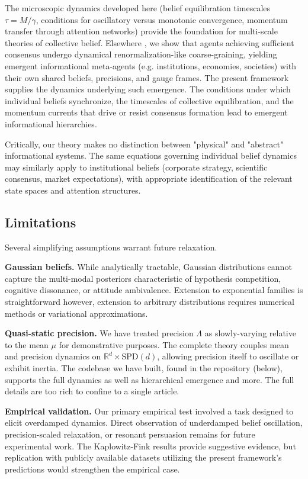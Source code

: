 \documentclass[12pt]{article}
\begin{document}
The microscopic dynamics developed here (belief equilibration timescales $\tau = M/\gamma$, conditions for oscillatory versus monotonic convergence, momentum transfer through attention networks) provide the foundation for multi-scale theories of collective belief. Elsewhere \citet{Dennis2025b}, we show that agents achieving sufficient consensus undergo dynamical renormalization-like coarse-graining, yielding emergent informational meta-agents (e.g. institutions, economies, societies) with their own shared beliefs, precisions, and gauge frames. The present framework supplies the dynamics underlying such emergence.  The conditions under which individual beliefs synchronize, the timescales of collective equilibration, and the momentum currents that drive or resist consensus formation lead to emergent informational hierarchies.

Critically, our theory makes no distinction between "physical" and "abstract" informational systems. The same equations governing individual belief dynamics may similarly apply to institutional beliefs (corporate strategy, scientific consensus, market expectations), with appropriate identification of the relevant state spaces and attention structures.

\subsection{Limitations}

Several simplifying assumptions warrant future relaxation.

\textbf{Gaussian beliefs.} While analytically tractable, Gaussian distributions cannot capture the multi-modal posteriors characteristic of hypothesis competition, cognitive dissonance, or attitude ambivalence. Extension to exponential families is straightforward however, extension to arbitrary distributions requires numerical methods or variational approximations.


\textbf{Quasi-static precision.} We have treated precision $\Lambda$ as slowly-varying relative to the mean $\mu$ for demonstrative purposes. The complete theory couples mean and precision dynamics on $\mathbb{R}^d \times \mathrm{SPD}(d)$, allowing precision itself to oscillate or exhibit inertia. The codebase we have built, found in the repository (below),  supports the full dynamics as well as hierarchical emergence and more. The full details are too rich to confine to a single article.

\textbf{Empirical validation.} Our primary empirical test involved a task designed to elicit overdamped dynamics. Direct observation of underdamped belief oscillation, precision-scaled relaxation, or resonant persuasion remains for future experimental work. The Kaplowitz-Fink results \citet{kaplowitz1983, fink2002} provide suggestive evidence, but replication with publicly available datasets utilizing the present framework's predictions would strengthen the empirical case.
\end{document}
